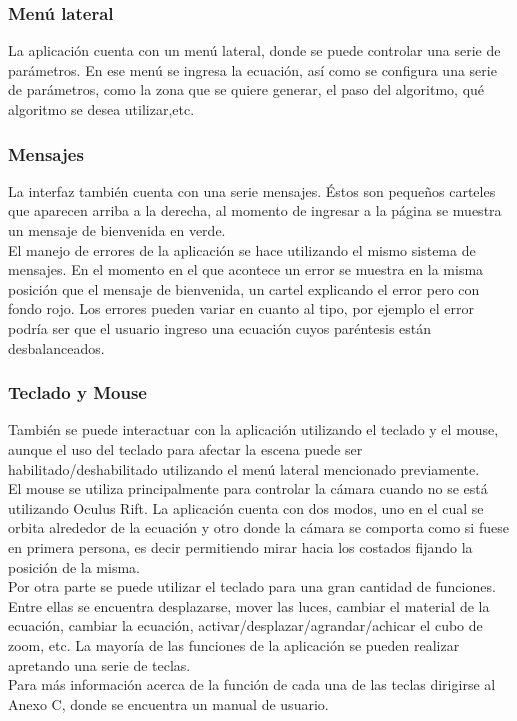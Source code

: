 \documentclass[12pt]{article}
\begin{document}
\subsubsection{Menú lateral}
La aplicación cuenta con un menú lateral, donde se puede controlar una serie de parámetros. En ese menú se ingresa la ecuación, así como se configura una serie de parámetros, como la zona que se quiere generar, el paso del algoritmo, qué algoritmo se desea utilizar,etc. 
\subsubsection{Mensajes}
La interfaz también cuenta con una serie mensajes. Éstos son pequeños carteles que aparecen arriba a la derecha, al momento de ingresar a la página se muestra un mensaje de bienvenida en verde. 
\\El manejo de errores de la aplicación se hace utilizando el mismo sistema de mensajes. En el momento en el que acontece un error se muestra en la misma posición que el mensaje de bienvenida, un cartel explicando el error pero con fondo rojo. Los errores pueden variar en cuanto al tipo, por ejemplo el error podría ser que el usuario ingreso una ecuación cuyos paréntesis están desbalanceados.
\subsubsection{Teclado y Mouse}
También se puede interactuar con la aplicación utilizando el teclado y el mouse, aunque el uso del teclado para afectar la escena puede ser habilitado/deshabilitado utilizando el menú lateral mencionado previamente.
\\El mouse se utiliza principalmente para controlar la cámara cuando no se está utilizando Oculus Rift. La aplicación cuenta con dos modos, uno en el cual se orbita alrededor de la ecuación y otro donde la cámara se comporta como si fuese en primera persona, es decir permitiendo mirar hacia los costados fijando la posición de la misma.
\\Por otra parte se puede utilizar el teclado para una gran cantidad de funciones. Entre ellas se encuentra desplazarse, mover las luces, cambiar el material de la ecuación, cambiar la ecuación, activar/desplazar/agrandar/achicar el cubo de zoom, etc. La mayoría de las funciones de la aplicación se pueden realizar apretando una serie de teclas.
\\Para más información acerca de la función de cada una de las teclas dirigirse al Anexo C, donde se encuentra un manual de usuario.
\clearpage
\end{document}
